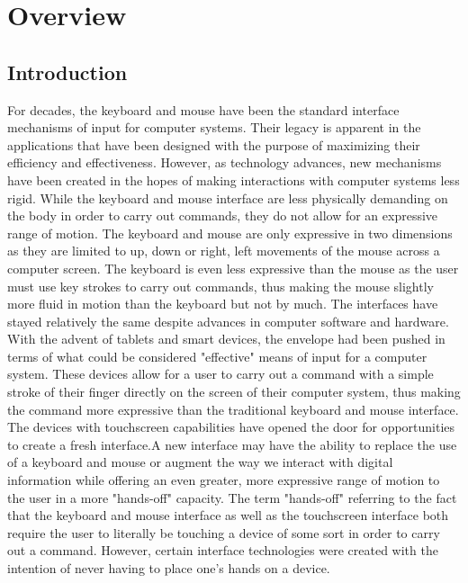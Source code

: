 
\chapter{Overview} %

\label{Chapter1} %


\section{Introduction}
For decades, the keyboard and mouse have been the standard interface mechanisms of input for computer systems. Their legacy is apparent in the applications that have been designed with the purpose of maximizing their efficiency and effectiveness. However, as technology advances, new mechanisms have been created in the hopes of making interactions with computer systems less rigid. While the keyboard and mouse interface are less physically demanding on the body in order to carry out commands, they do not allow for an expressive range of motion. The keyboard and mouse are only expressive in two dimensions as they are limited to up, down or right, left movements of the mouse across a computer screen. The keyboard is even less expressive than the mouse as the user must use key strokes to carry out commands, thus making the mouse slightly more fluid in motion than the keyboard but not by much. The interfaces have stayed relatively the same despite advances in computer software and hardware. With the advent of tablets and smart devices, the envelope had been pushed in terms of what could be considered "effective" means of input for a computer system. These devices allow for a user to carry out a command with a simple stroke of their finger directly on the screen of their computer system, thus making the command more expressive than the traditional keyboard and mouse interface. The devices with touchscreen capabilities have opened the door for opportunities to create a fresh interface.A new interface may have the ability to replace the use of a keyboard and mouse or augment the way we interact with digital information while offering an even greater, more expressive range of motion to the user in a more "hands-off" capacity. The term "hands-off" referring to the fact that the keyboard and mouse interface as well as the touchscreen interface both require the user to literally be touching a device of some sort in order to carry out a command. However, certain interface technologies were created with the intention of never having to place one's hands on a device.

